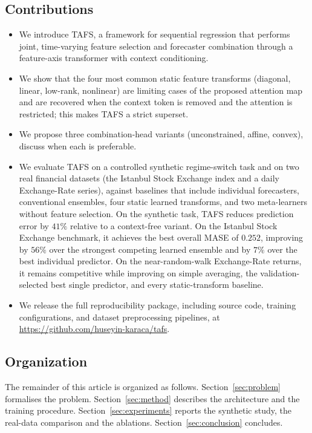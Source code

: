 \documentclass[journal]{IEEEtran}
\begin{document}
\subsection{Contributions}

\begin{itemize}
\item We introduce TAFS, a framework for sequential regression that performs joint, time-varying feature selection and forecaster combination through a feature-axis transformer with context conditioning.
\item We show that the four most common static feature transforms (diagonal, linear, low-rank, nonlinear) are limiting cases of the proposed attention map and are recovered when the context token is removed and the attention is restricted; this makes TAFS a strict superset.
\item We propose three combination-head variants (unconstrained, affine, convex), discuss when each is preferable. 
\item We evaluate TAFS on a controlled synthetic regime-switch task and on two real financial datasets (the Istanbul Stock Exchange index and a daily Exchange-Rate series), against baselines that include individual forecasters, conventional ensembles, four static learned transforms, and two meta-learners without feature selection. On the synthetic task, TAFS reduces prediction error by $41\%$ relative to a context-free variant. On the Istanbul Stock Exchange benchmark, it achieves the best overall MASE of $0.252$, improving by $56\%$ over the strongest competing learned ensemble and by $7\%$ over the best individual predictor. On the near-random-walk Exchange-Rate returns, it remains competitive while improving on simple averaging, the validation-selected best single predictor, and every static-transform baseline.

\item We release the full reproducibility package, including source code, training configurations, and dataset preprocessing pipelines, at \url{https://github.com/huseyin-karaca/tafs}.
\end{itemize}

\subsection{Organization}
The remainder of this article is organized as follows. Section~\ref{sec:problem} formalises the problem. Section~\ref{sec:method} describes the architecture and the training procedure. Section~\ref{sec:experiments} reports the synthetic study, the real-data comparison and the ablations. Section~\ref{sec:conclusion} concludes.
\end{document}
